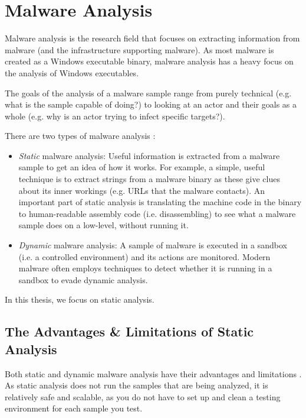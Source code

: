 \section{Malware Analysis}\label{section:malware analysis}
Malware analysis is the research field that focuses on extracting information from malware (and the infrastructure supporting malware). As most malware is created as a Windows executable binary, malware analysis has a heavy focus on the analysis of Windows executables.

\medskip

The goals of the analysis of a malware sample range from purely technical (e.g. what is the sample capable of doing?) to looking at an actor and their goals as a whole (e.g. why is an actor trying to infect specific targets?).

\medskip

There are two types of malware analysis \cite{practical-malware-analysis}:
\begin{itemize}
    \item \emph{Static} malware analysis: Useful information is extracted from a malware sample to get an idea of how it works. For example, a simple, useful technique is to extract strings from a malware binary as these give clues about its inner workings (e.g. URLs that the malware contacts). An important part of static analysis is translating the machine code in the binary to human-readable assembly code (i.e. disassembling) to see what a malware sample does on a low-level, without running it.

    \item \emph{Dynamic} malware analysis: A sample of malware is executed in a sandbox (i.e. a controlled environment) and its actions are monitored. Modern malware often employs techniques to detect whether it is running in a sandbox to evade dynamic analysis.
\end{itemize}

In this thesis, we focus on static analysis.

\subsection{The Advantages \& Limitations of Static Analysis}
Both static and dynamic malware analysis have their advantages and limitations \cite{survey-anti-analysis}. As static analysis does not run the samples that are being analyzed, it is relatively safe and scalable, as you do not have to set up and clean a testing environment for each sample you test.

